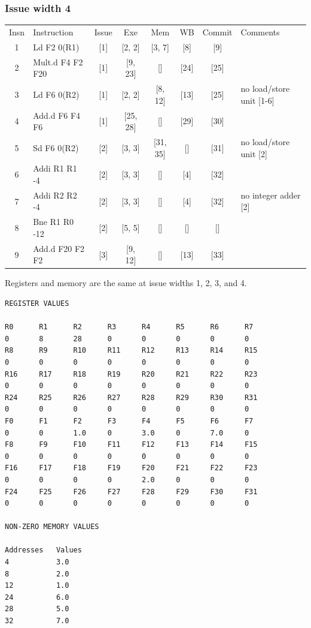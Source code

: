 \documentclass[11pt]{article}
\begin{document}
\subsubsection*{Issue width 4}
\begin{center}
\scriptsize
\setlength{\tabcolsep}{8pt}
\renewcommand{\arraystretch}{1.35}
\begin{tabular}{clccccc>{\raggedright\arraybackslash}p{1.4in}}
Insn & Instruction & Issue & Exe & Mem & WB & Commit & Comments \\
1 & Ld F2 0(R1) & [1] & [2, 2] & [3, 7] & [8] & [9] &  \\
2 & Mult.d F4 F2 F20 & [1] & [9, 23] & [] & [24] & [25] &  \\
3 & Ld F6 0(R2) & [1] & [2, 2] & [8, 12] & [13] & [25] & no load/store unit [1-6] \\
4 & Add.d F6 F4 F6 & [1] & [25, 28] & [] & [29] & [30] &  \\
5 & Sd F6 0(R2) & [2] & [3, 3] & [31, 35] & [] & [31] & no load/store unit [2] \\
6 & Addi R1 R1 -4 & [2] & [3, 3] & [] & [4] & [32] &  \\
7 & Addi R2 R2 -4 & [2] & [3, 3] & [] & [4] & [32] & no integer adder [2] \\
8 & Bne R1 R0 -12 & [2] & [5, 5] & [] & [] & [] &  \\
9 & Add.d F20 F2 F2 & [3] & [9, 12] & [] & [13] & [33] &  \\
\end{tabular}
\end{center}
Registers and memory are the same at issue widths 1, 2, 3, and 4.
\begin{Verbatim}[fontsize=\scriptsize]
REGISTER VALUES

R0      R1      R2      R3      R4      R5      R6      R7      
0       8       28      0       0       0       0       0       
R8      R9      R10     R11     R12     R13     R14     R15     
0       0       0       0       0       0       0       0       
R16     R17     R18     R19     R20     R21     R22     R23     
0       0       0       0       0       0       0       0       
R24     R25     R26     R27     R28     R29     R30     R31     
0       0       0       0       0       0       0       0       
F0      F1      F2      F3      F4      F5      F6      F7      
0       0       1.0     0       3.0     0       7.0     0       
F8      F9      F10     F11     F12     F13     F14     F15     
0       0       0       0       0       0       0       0       
F16     F17     F18     F19     F20     F21     F22     F23     
0       0       0       0       2.0     0       0       0       
F24     F25     F26     F27     F28     F29     F30     F31     
0       0       0       0       0       0       0       0       

NON-ZERO MEMORY VALUES

Addresses   Values
4           3.0
8           2.0
12          1.0
24          6.0
28          5.0
32          7.0
\end{Verbatim}
\clearpage
\end{document}
